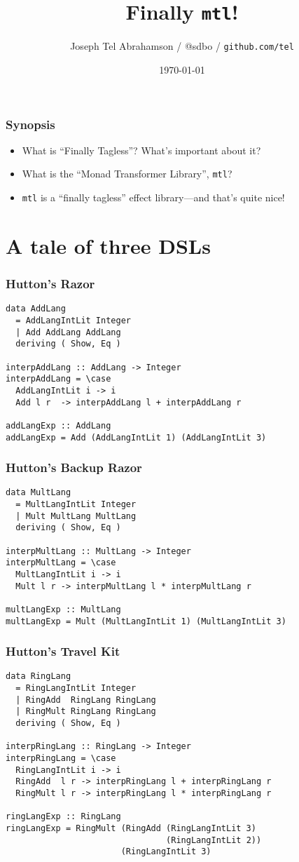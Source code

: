 \documentclass[pdf]{beamer}
\title{Finally \texttt{mtl}!}
\date{\today}
\author{Joseph Tel Abrahamson / @sdbo / \texttt{github.com/tel} }
\begin{document}
\maketitle

\begin{frame}
  \frametitle{Synopsis}
  \begin{itemize}
  \item What is ``Finally Tagless''? What's important about it?
  \item What is the ``Monad Transformer Library'', \texttt{mtl}?
  \item \texttt{mtl} is a ``finally tagless'' effect library---and that's quite
    nice!
  \end{itemize}
\end{frame}

\section{A tale of three DSLs}

\begin{frame}[fragile]
  \frametitle{Hutton's Razor}
\begin{lstlisting}
data AddLang
  = AddLangIntLit Integer
  | Add AddLang AddLang
  deriving ( Show, Eq )

interpAddLang :: AddLang -> Integer
interpAddLang = \case
  AddLangIntLit i -> i
  Add l r  -> interpAddLang l + interpAddLang r

addLangExp :: AddLang
addLangExp = Add (AddLangIntLit 1) (AddLangIntLit 3)
\end{lstlisting}
\end{frame}

\begin{frame}[fragile]
  \frametitle{Hutton's Backup Razor}
\begin{lstlisting}
data MultLang
  = MultLangIntLit Integer
  | Mult MultLang MultLang
  deriving ( Show, Eq )

interpMultLang :: MultLang -> Integer
interpMultLang = \case
  MultLangIntLit i -> i
  Mult l r -> interpMultLang l * interpMultLang r

multLangExp :: MultLang
multLangExp = Mult (MultLangIntLit 1) (MultLangIntLit 3)
\end{lstlisting}
\end{frame}

\begin{frame}[fragile]
  \frametitle{Hutton's Travel Kit}
\begin{lstlisting}
data RingLang
  = RingLangIntLit Integer
  | RingAdd  RingLang RingLang
  | RingMult RingLang RingLang
  deriving ( Show, Eq )

interpRingLang :: RingLang -> Integer
interpRingLang = \case
  RingLangIntLit i -> i
  RingAdd  l r -> interpRingLang l + interpRingLang r
  RingMult l r -> interpRingLang l * interpRingLang r

ringLangExp :: RingLang
ringLangExp = RingMult (RingAdd (RingLangIntLit 3) 
                                (RingLangIntLit 2)) 
                       (RingLangIntLit 3)
\end{lstlisting}
\end{frame}
\end{document}
